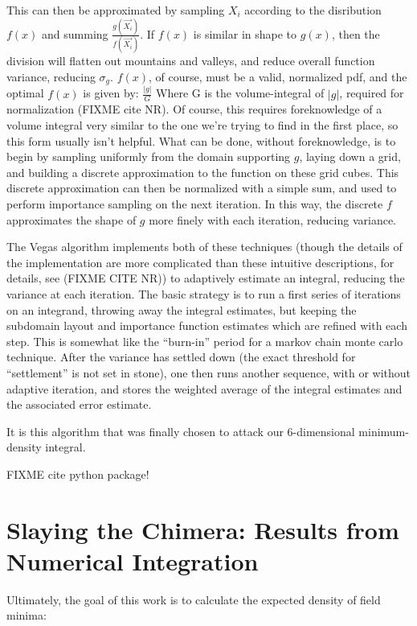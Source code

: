 \documentclass[10pt,letterpaper]{article}
\begin{document}
This can then be approximated by sampling $X_i$ according to the disribution $f(x)$ and summing $\frac{g(\vec{X_i})}{f(\vec{X_i})}$. If $f(x)$ is similar in shape to $g(x)$, then the division will flatten out mountains and valleys, and reduce overall function variance, reducing $\sigma_g$. $f(x)$, of course, must be a valid, normalized pdf, and the optimal $f(x)$ is given by: $\frac{|g|}{G}$ Where G is the volume-integral of $|g|$, required for normalization (FIXME cite NR). Of course, this requires foreknowledge of a volume integral very similar to the one we're trying to find in the first place, so this form usually isn't helpful.
What can be done, without foreknowledge, is to begin by sampling uniformly from the domain supporting $g$, laying down a grid, and building a discrete approximation to the function on these grid cubes. This discrete approximation can then be normalized with a simple sum, and used to perform importance sampling on the next iteration. In this way, the discrete $f$ approximates the shape of $g$ more finely with each iteration, reducing variance.

The Vegas algorithm implements both of these techniques (though the details of the implementation are more complicated than these intuitive descriptions, for details, see (FIXME CITE NR)) to adaptively estimate an integral, reducing the variance at each iteration. The basic strategy is to run a first series of iterations on an integrand, throwing away the integral estimates, but keeping the subdomain layout and importance function estimates which are refined with each step. This is somewhat like the ``burn-in'' period for a markov chain monte carlo technique. After the variance has settled down (the exact threshold for ``settlement'' is not set in stone), one then runs another sequence, with or without adaptive iteration, and stores the weighted average of the integral estimates and the associated error estimate.

It is this algorithm that was finally chosen to attack our 6-dimensional minimum-density integral.

FIXME cite python package!

\section{Slaying the Chimera: Results from Numerical Integration} \label{results}

Ultimately, the goal of this work is to calculate the expected density of field minima: 
\end{document}
